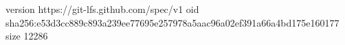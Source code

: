 version https://git-lfs.github.com/spec/v1
oid sha256:e53d3cc889c893a239ee77695e257978a5aac96a02ef391a66a4bd175e160177
size 12286
